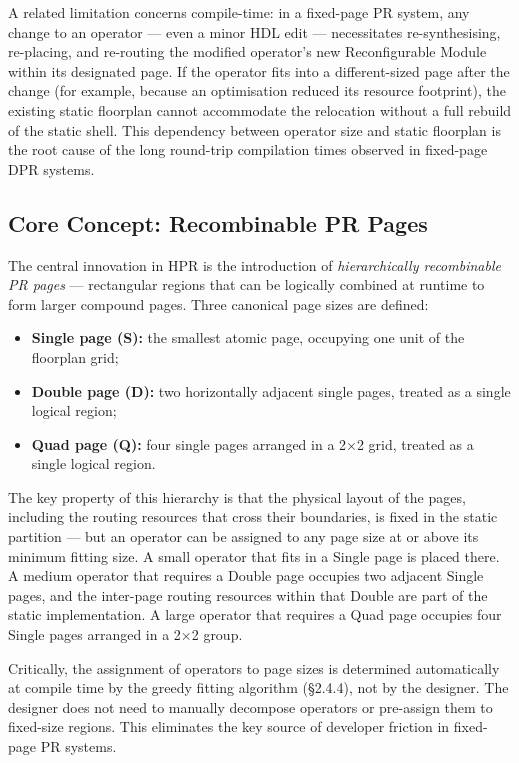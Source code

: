 A related limitation concerns compile-time: in a fixed-page PR system, any change to an operator — even a minor HDL edit — necessitates re-synthesising, re-placing, and re-routing the modified operator's new Reconfigurable Module within its designated page. If the operator fits into a different-sized page after the change (for example, because an optimisation reduced its resource footprint), the existing static floorplan cannot accommodate the relocation without a full rebuild of the static shell. This dependency between operator size and static floorplan is the root cause of the long round-trip compilation times observed in fixed-page DPR systems.

\subsection{Core Concept: Recombinable PR Pages}

The central innovation in HPR is the introduction of \textit{hierarchically recombinable PR pages} — rectangular regions that can be logically combined at runtime to form larger compound pages. Three canonical page sizes are defined:

\begin{itemize}
  \item \textbf{Single page (S):} the smallest atomic page, occupying one unit of the floorplan grid;
  \item \textbf{Double page (D):} two horizontally adjacent single pages, treated as a single logical region;
  \item \textbf{Quad page (Q):} four single pages arranged in a 2×2 grid, treated as a single logical region.
\end{itemize}
The key property of this hierarchy is that the physical layout of the pages, including the routing resources that cross their boundaries, is fixed in the static partition — but an operator can be assigned to any page size at or above its minimum fitting size. A small operator that fits in a Single page is placed there. A medium operator that requires a Double page occupies two adjacent Single pages, and the inter-page routing resources within that Double are part of the static implementation. A large operator that requires a Quad page occupies four Single pages arranged in a 2×2 group.

Critically, the assignment of operators to page sizes is determined automatically at compile time by the greedy fitting algorithm (§2.4.4), not by the designer. The designer does not need to manually decompose operators or pre-assign them to fixed-size regions. This eliminates the key source of developer friction in fixed-page PR systems.

